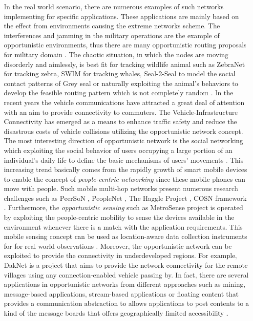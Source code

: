 In the real world scenario, there are numerous examples of such networks implementing for specific applications. 
These applications are mainly based on the effect from environments causing the extreme networks scheme.
The interferences and jamming in the military operations are the example of opportunistic environments, thus there are many opportunistic routing proposals for military domain \cite{Kerdsri2012a,Scott2005,Kidston2012,Haillot2009}.
The chaotic situation, in which the nodes are moving disorderly and aimlessly, is best fit for tracking wildlife animal such as ZebraNet \cite{zebranet2004} for tracking zebra, SWIM \cite{Small2003} for tracking whales, Seal-2-Seal \cite{Lindgren2008} to model the social contact patterns of Grey seal or naturally exploiting the animal’s behaviors to develop the feasible routing pattern which is not completely random \cite{Yu2007a}.
In the recent years the vehicle communications have attracted a great deal of attention with an aim to provide connectivity to commuters.
The Vehicle-Infrastructure Connectivity \cite{Khabbaz2011,Morris2000,Singh2002,Kun-De2002,Briesemeister2000,Gavrilovich2001,Wang2010,Qi2011,DING201432,Kumar201422} has emerged as a means to enhance traffic safety and reduce the disastrous costs of vehicle collisions \cite{Khabbaz2012} utilizing the opportunistic network concept.
The most interesting direction of opportunistic network is the social networking which exploiting the social behavior of users occupying a large portion of an individual’s daily life to define the basic mechanisms of users’ movements \cite{boldrini2008}.
%
This increasing trend basically comes from the rapidly growth of smart mobile devices to enable the concept of \emph{people-centric networking} \cite{Conti2014} since these mobile phones can move with people.
%
Such mobile multi-hop networks present numerous research challenges such as PeerSoN \cite{Sonja2009,PeerSoN}, PeopleNet \cite{Motani2005}, The Haggle Project \cite{Haggle,Papandrea2009}, COSN framework \cite{Garg2012}.
%
Furthermore, the \emph{opportunistic sensing} such as MetroSense project \cite{Campbell2008} is operated by exploiting the people-centric mobility to sense the devices available in the environment whenever there is a match with the application requirements. 
%
This mobile sensing concept can be used as location-aware data collection instruments for for real world observations \cite{Conti2014}.
%
Moreover, the opportunistic network can be exploited to provide the connectivity in underdeveloped regions.
%
For example, DakNet \cite{Pentland2004} is a project that aims to provide the network connectivity for the remote villages using any connection-enabled vehicle passing by.
In fact, there are several applications in opportunistic networks \cite{Kärkkäinen2013} from different approaches such as mining, message-based applications, stream-based applications or floating content that provides a communication abstraction to allows applications to post contents to a kind of the message boards that offers geographically limited accessibility \cite{Ott2011}.

